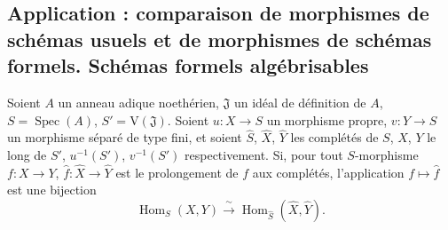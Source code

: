 \subsection{Application : comparaison de morphismes de schémas usuels et de morphismes de schémas formels. Schémas formels algébrisables}
\label{subsection:III.5.4-fr}

\begin{theorem}[5.4.1]
\label{III.5.4.1-fr}
Soient $A$ un anneau adique noethérien, $\mathfrak J$ un idéal de définition de
$A$, $S=\operatorname{Spec}(A)$, $S'=\mathrm V(\mathfrak J)$. Soient
$u:X\to S$ un morphisme propre, $v:Y\to S$ un morphisme séparé de type fini, et
soient $\widehat S$, $\widehat X$, $\widehat Y$ les complétés de $S$, $X$, $Y$ le
long de $S'$, $u^{-1}(S')$, $v^{-1}(S')$ respectivement. Si, pour tout
$S$-morphisme $f:X\to Y$, $\widehat f:\widehat X\to\widehat Y$ est le
prolongement de $f$ aux complétés, l'application $f\mapsto\widehat f$ est une
bijection
\[
\operatorname{Hom}_S(X,Y)\xrightarrow{\ \sim\ }
\operatorname{Hom}_{\widehat S}(\widehat X,\widehat Y).
\]
\end{theorem}


